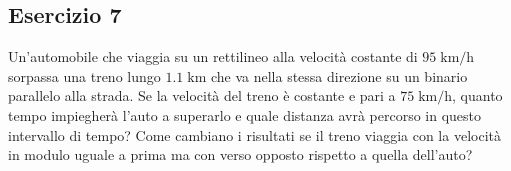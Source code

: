 \documentclass[12pt,a4paper]{book}
\begin{document}
\subsection*{Esercizio 7} 
Un'automobile che viaggia su un rettilineo alla velocità costante di $95\;\text{km/h}$ sorpassa una treno lungo $1.1\;\text{km}$ che va nella stessa direzione su un binario parallelo alla strada. Se la velocità del treno è costante e pari a $75\;\text{km/h}$, quanto tempo impiegherà l'auto a superarlo e quale distanza avrà percorso in questo intervallo di tempo? Come cambiano i risultati se il treno viaggia con la velocità in modulo uguale a prima ma con verso opposto rispetto a quella dell'auto?

\end{document}
